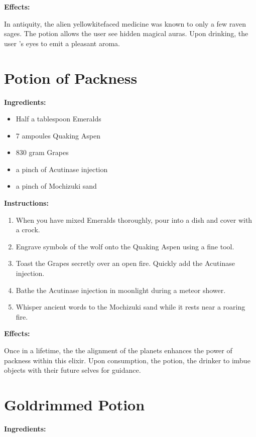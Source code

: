 \documentclass{article}
\begin{document}
\textbf{Effects:}

In antiquity, the alien yellowkitefaced medicine was known to only a few raven sages. The potion allows the user see hidden magical auras. Upon drinking, the user 's eyes to emit a pleasant aroma.

\newpage
\section*{Potion of Packness}

\textbf{Ingredients:}

\begin{itemize}
  \item Half a tablespoon Emeralds
  \item 7 ampoules Quaking Aspen
  \item 830 gram Grapes
  \item a pinch of Acutinase injection
  \item a pinch of Mochizuki sand
\end{itemize}

\textbf{Instructions:}

\begin{enumerate}
  \item When you have mixed Emeralds thoroughly, pour into a dish and cover with a crock.
  \item Engrave symbols of the wolf onto the Quaking Aspen using a fine tool.
  \item Toast the Grapes secretly over an open fire. Quickly add the Acutinase injection.
  \item Bathe the Acutinase injection in moonlight during a meteor shower.
  \item Whisper ancient words to the Mochizuki sand while it rests near a roaring fire.
\end{enumerate}

\textbf{Effects:}

Once in a lifetime, the the alignment of the planets enhances the power of packness within this elixir. Upon consumption, the potion, the drinker to imbue objects with their future selves for guidance.

\newpage
\section*{Goldrimmed Potion}

\textbf{Ingredients:}
\end{document}
